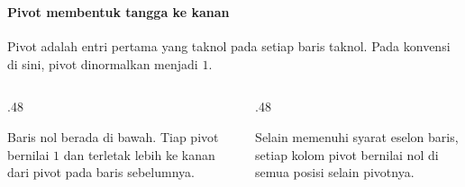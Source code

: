 \documentclass{../../kalkulus-ppt}
\begin{document}
\begin{frame}
    \frametitle{\insertsection}
    \framesubtitle{Pivot membentuk tangga ke kanan}
    Pivot adalah entri pertama yang taknol pada setiap baris taknol. Pada konvensi di sini, pivot dinormalkan menjadi $1$.
    \par\smallskip
    \begin{columns}[T,onlytextwidth]
        \begin{column}{.48\textwidth}
            \begin{definisi}
                Baris nol berada di bawah. Tiap pivot bernilai $1$ dan terletak lebih ke kanan dari pivot pada baris sebelumnya.
            \end{definisi}
        \end{column}
        \begin{column}{.48\textwidth}
            \begin{definisi}
                Selain memenuhi syarat eselon baris, setiap kolom pivot bernilai nol di semua posisi selain pivotnya.
            \end{definisi}
        \end{column}
    \end{columns}
\end{frame}
\end{document}
